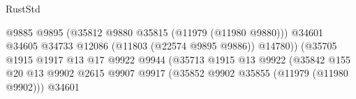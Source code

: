 \begin{lexlean}{RustStd}
\begin{coremodule}
                                                                @9885
                                                                @9895
                                                                (@35812
                                                                  @9880
                                                                  @35815
                                                                  (@11979 (@11980 @9880)))
                                                                @34601
                                                                @34605
                                                                @34733
                                                                @12086
                                                                (@11803 (@22574 @9895 @9886))
                                                                @14780))
                                                            (@35705
                                                              @1915
                                                              @1917
                                                              @13
                                                              @17
                                                              @9922
                                                              @9944
                                                              (@35713
                                                                @1915
                                                                @13
                                                                @9922
                                                                (@35842
                                                                  @155
                                                                  @20
                                                                  @13
                                                                  @9902
                                                                  @2615
                                                                  @9907
                                                                  @9917
                                                                  (@35852
                                                                    @9902
                                                                    @35855
                                                                    (@11979 (@11980 @9902)))
                                                                  @34601

\end{coremodule}
\end{lexlean}

